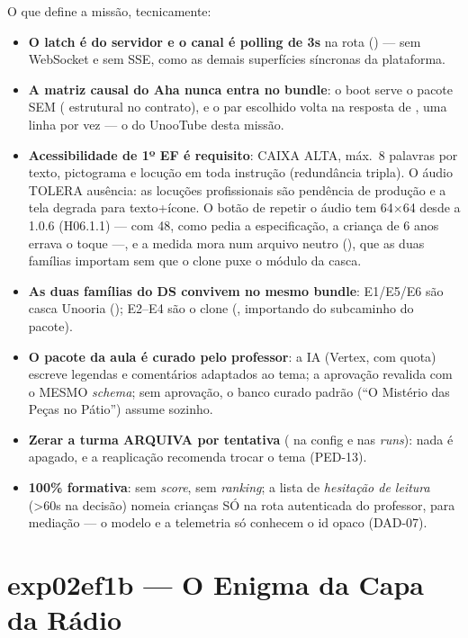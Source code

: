O que define a missão, tecnicamente:

\begin{itemize}
  \item \textbf{O latch é do servidor e o canal é polling de 3s} na rota
     () --- sem WebSocket e sem SSE,
    como as demais superfícies síncronas da plataforma.
  \item \textbf{A matriz causal do Aha nunca entra no bundle}: o boot serve o
    pacote SEM  ( estrutural no contrato), e o par
    escolhido volta na resposta de , uma linha
    por vez --- o  do UnooTube desta missão.
  \item \textbf{Acessibilidade de 1º EF é requisito}: CAIXA ALTA, máx.\ 8
    palavras por texto, pictograma e locução em toda instrução (redundância
    tripla). O áudio TOLERA ausência: as locuções profissionais são pendência
    de produção e a tela degrada para texto+ícone. O botão de repetir o áudio
    tem 64$\times$64 desde a 1.0.6 (H06.1.1) --- com 48, como pedia a
    especificação, a criança de 6 anos errava o toque ---, e a medida mora num
    arquivo neutro (), que as duas famílias
    importam sem que o clone puxe o módulo da casca.
  \item \textbf{As duas famílias do DS convivem no mesmo bundle}: E1/E5/E6 são
    casca Unooria (); E2--E4 são o clone
    (, importando do subcaminho do pacote).
  \item \textbf{O pacote da aula é curado pelo professor}: a IA (Vertex, com
    quota) escreve legendas e comentários adaptados ao tema; a aprovação
    revalida com o MESMO \emph{schema}; sem aprovação, o banco curado padrão
    (\enquote{O Mistério das Peças no Pátio}) assume sozinho.
  \item \textbf{Zerar a turma ARQUIVA por tentativa} ( na config
    e nas \emph{runs}): nada é apagado, e a reaplicação recomenda trocar o
    tema (PED-13).
  \item \textbf{100\% formativa}: sem \emph{score}, sem \emph{ranking}; a
    lista de \emph{hesitação de leitura} (>60s na decisão) nomeia crianças SÓ
    na rota autenticada do professor, para mediação --- o modelo e a
    telemetria só conhecem o id opaco (DAD-07).
\end{itemize}

\section{exp02ef1b --- O Enigma da Capa da Rádio}
\label{sec:exp02ef1b}

